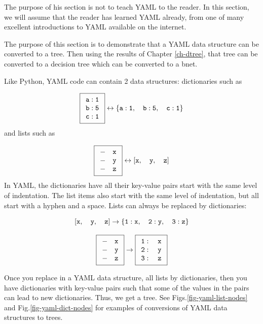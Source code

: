 The purpose of his section is not to teach
YAML to the reader.
In this section, we will
assume that the reader has learned YAML already,
from one of many excellent introductions to YAML
available on the internet.


The purpose of this section is to
demonstrate that a YAML data structure can be converted to
a tree. Then using
the results of Chapter \ref{ch-dtree}, that tree can be converted to a decision tree which can be converted to a bnet.

Like Python, YAML code 
can contain 2 data structures: dictionaries
such as 

$$\boxed{\begin{array}{l}
{\tt a:1}\\
{\tt b:5}\\
{\tt c:1}
\end{array}}
\leftrightarrow
{\tt \{a:1,\quad b:5,\quad c:1\}} 
$$
and lists such as

$$
\boxed{
\begin{array}{l}
{\tt - \quad x}\\
{\tt -\quad y}\\
{\tt -\quad z}
\end{array}}
\leftrightarrow
{\tt [x,\quad y,\quad z]}
$$
In YAML, the dictionaries
have all their key-value
pairs start with the same level of indentation.
The list items also start with
the same level of indentation, but all start with a hyphen and a space.
Lists can always be replaced by dictionaries:

$${\tt [x,\quad y,\quad z] \rightarrow
\{1:x, \quad 2:y,\quad 3:z\}}
$$

$$
\boxed{
\begin{array}{l}
{\tt - \quad x}\\
{\tt -\quad y}\\
{\tt -\quad z}
\end{array}}
\rightarrow
\boxed{
\begin{array}{l}
{\tt 1: \quad x}\\
{\tt 2: \quad y}\\
{\tt 3:\quad z}
\end{array}}
$$

Once you replace in
a YAML data structure, all lists
by dictionaries,
then you have dictionaries 
with key-value pairs such that
some of the values in the pairs can lead to new dictionaries. Thus, we get a tree. See Figs.\ref{fig-yaml-list-nodes}
and Fig.\ref{fig-yaml-dict-nodes}
for examples of conversions
of YAML data structures to trees.


